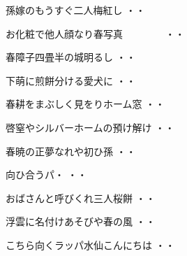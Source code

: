 \vspace{0.6cm}
\begin{shiika}孫嫁のもうすぐ二人梅紅し
\hfill{・・}\end{shiika}
\vspace{0.6cm}
\begin{shiika}お化粧で他人顔なり春写真　　　　
\hfill{・・}\end{shiika}
\vspace{0.6cm}
\begin{shiika}春障子四畳半の城明るし
\hfill{・・}\end{shiika}
\vspace{0.6cm}
\begin{shiika}下萌に煎餅分ける愛犬に
\hfill{・・}\end{shiika}
\vspace{0.6cm}
\begin{shiika}春耕をまぶしく見をりホーム窓
\hfill{・・}\end{shiika}
\vspace{0.6cm}
\begin{shiika}啓窒やシルバーホームの預け解け
\hfill{・・}\end{shiika}
\vspace{0.6cm}
\begin{shiika}春暁の正夢なれや初ひ孫
\hfill{・・}\end{shiika}
\vspace{0.6cm}
\begin{shiika}向ひ合うパ・
\hfill{・・}\end{shiika}
\vspace{0.6cm}
\begin{shiika}おばさんと呼びくれ三人桜餅
\hfill{・・}\end{shiika}
\vspace{0.6cm}
\begin{shiika}浮雲に名付けあそびや春の風
\hfill{・・}\end{shiika}
\vspace{0.6cm}
\begin{shiika}こちら向くラッパ水仙こんにちは
\hfill{・・}\end{shiika}
\vspace{0.6cm}
